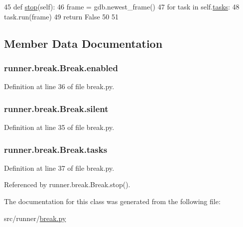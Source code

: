 \begin{DoxyCode}
45     \textcolor{keyword}{def }\hyperlink{classrunner_1_1break_1_1Break_a86f8753c50874c48268678aba0bf9332}{stop}(self):
46         frame = gdb.newest\_frame()
47         \textcolor{keywordflow}{for} task \textcolor{keywordflow}{in} self.\hyperlink{classrunner_1_1break_1_1Break_a58f1c19e0ab172954c3a944a9b8d1b5d}{tasks}:
48             task.run(frame)
49         \textcolor{keywordflow}{return} \textcolor{keyword}{False}
50 
51 \end{DoxyCode}


\subsection{Member Data Documentation}
\hypertarget{classrunner_1_1break_1_1Break_a8076831cad893a375675ef1032454bab}{}
\subsubsection[{enabled}]{\setlength{\rightskip}{0pt plus 5cm}runner.\+break.\+Break.\+enabled}\label{classrunner_1_1break_1_1Break_a8076831cad893a375675ef1032454bab}


Definition at line 36 of file break.\+py.

\hypertarget{classrunner_1_1break_1_1Break_a9c73bd0c8672b609bfa868df7b759d15}{}
\subsubsection[{silent}]{\setlength{\rightskip}{0pt plus 5cm}runner.\+break.\+Break.\+silent}\label{classrunner_1_1break_1_1Break_a9c73bd0c8672b609bfa868df7b759d15}


Definition at line 35 of file break.\+py.

\hypertarget{classrunner_1_1break_1_1Break_a58f1c19e0ab172954c3a944a9b8d1b5d}{}
\subsubsection[{tasks}]{\setlength{\rightskip}{0pt plus 5cm}runner.\+break.\+Break.\+tasks}\label{classrunner_1_1break_1_1Break_a58f1c19e0ab172954c3a944a9b8d1b5d}


Definition at line 37 of file break.\+py.



Referenced by runner.\+break.\+Break.\+stop().



The documentation for this class was generated from the following file\+:\begin{DoxyCompactItemize}
\item 
src/runner/\hyperlink{break_8py}{break.\+py}\end{DoxyCompactItemize}
